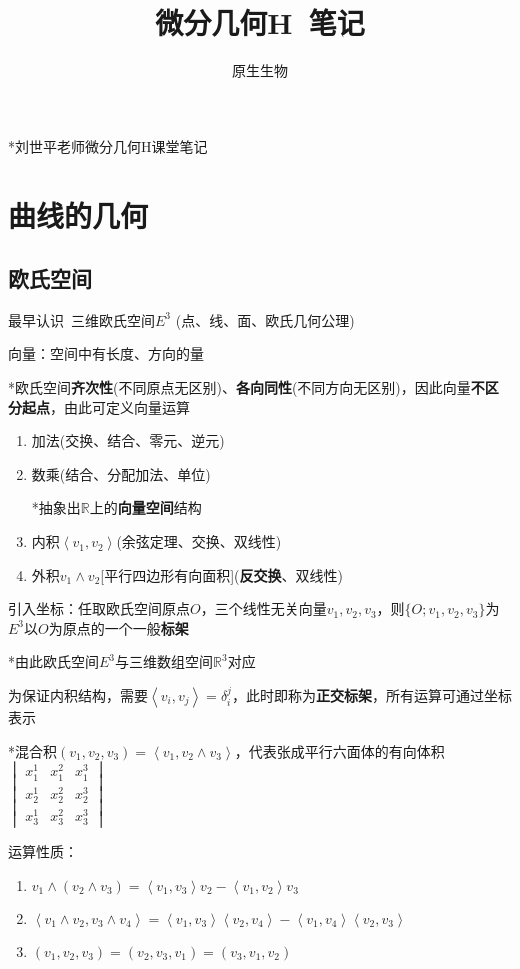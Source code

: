 \documentclass[a4paper,UTF8,fontset=windows]{ctexart}
\title{\textbf{微分几何H\ 笔记}}
\author{原生生物}
\date{}
\begin{document}
\maketitle

*刘世平老师微分几何H课堂笔记

\tableofcontents

\newpage

\section{曲线的几何}
\subsection{欧氏空间}
最早认识\ 三维欧氏空间$E^3$ (点、线、面、欧氏几何公理)

向量：空间中有长度、方向的量

*欧氏空间\textbf{齐次性}(不同原点无区别)、\textbf{各向同性}(不同方向无区别)，因此向量\textbf{不区分起点}，由此可定义向量运算

\begin{enumerate}
    \item 加法(交换、结合、零元、逆元)
    \item 数乘(结合、分配加法、单位)

        *抽象出$\mathbb{R}$上的\textbf{向量空间}结构

    \item 内积$\left<v_1,v_2\right>$(余弦定理、交换、双线性)
    \item 外积$v_1\wedge v_2$[平行四边形有向面积](\textbf{反交换}、双线性)
\end{enumerate}

引入坐标：任取欧氏空间原点$O$，三个线性无关向量$v_1,v_2,v_3$，则$\{O;v_1,v_2,v_3\}$为$E^3$以$O$为原点的一个一般\textbf{标架}

*由此欧氏空间$E^3$与三维数组空间$\mathbb{R}^3$对应

为保证内积结构，需要$\left<v_i,v_j\right>=\delta_i^j$，此时即称为\textbf{正交标架}，所有运算可通过坐标表示

*混合积$(v_1,v_2,v_3)=\left<v_1,v_2\wedge v_3\right>$，代表张成平行六面体的有向体积$\begin{vmatrix}x_1^1&x_1^2&x_1^3\\x_2^1&x_2^2&x_2^3\\x_3^1&x_3^2&x_3^3\end{vmatrix}$

运算性质：

\begin{enumerate}
    \item $v_1\wedge(v_2\wedge v_3)=\left<v_1,v_3\right>v_2-\left<v_1,v_2\right>v_3$
    \item $\left<v_1\wedge v_2,v_3\wedge v_4\right>=\left<v_1,v_3\right>\left<v_2,v_4\right>-\left<v_1,v_4\right>\left<v_2,v_3\right>$
    \item $(v_1,v_2,v_3)=(v_2,v_3,v_1)=(v_3,v_1,v_2)$
\end{enumerate}
\end{document}
